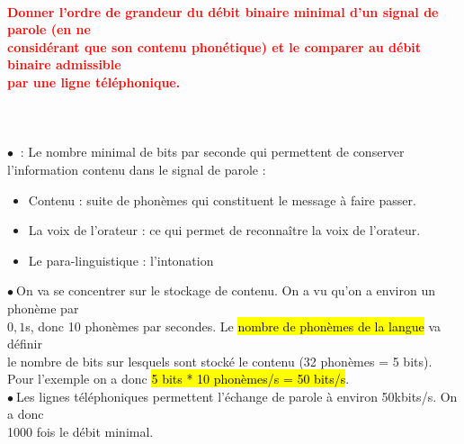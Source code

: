 \documentclass[letterpaper, 12pt]{article}
\newcommand{\alinea}{
\hspace*{0.3cm}}
\newcommand{\red}[1]{
	\textcolor{red}{#1}
}
\newcommand{\myul}[1]{
	\underline{\smash{#1}}
}
\newcommand{\point}{$\bullet\ $}
\begin{document}
		\paragraph{\red{Donner l'ordre de grandeur du débit binaire minimal d'un signal de parole (en ne  
		~\\ \hspace*{0.035cm} considérant que son contenu phonétique) et le comparer au débit binaire admissible  
		~\\ \hspace*{0.035cm} par une ligne téléphonique.}}~\\~\\
			\point \myul{Débit minimal} : Le nombre minimal de bits par seconde qui permettent de conserver
				\\\alinea l'information contenu dans le signal de parole : 
				\begin{itemize}
					\setlength{\itemsep}{0pt}		
					\setlength{\parskip}{0pt}		
					\setlength{\parsep}{0pt}	
					\item Contenu : suite de phonèmes qui constituent le message à faire passer.
					\item La voix de l'orateur : ce qui permet de reconnaître la voix de l'orateur.
					\item Le para-linguistique : l'intonation
				\end{itemize}
			\point On va se concentrer sur le stockage de contenu. On a vu qu'on a environ un phonème par 
				\\\alinea $0,1$s, donc 10 phonèmes par secondes. Le \hl{nombre de phon\`emes de la langue} 
				va d\'efinir
				\\\alinea le nombre de bits sur lesquels sont stocké le contenu (32 phonèmes = 5 bits).
				\\\alinea Pour l'exemple on a donc \hl{5 bits * 10 phon\`emes/s = 50 bits/s}.\\
			\point Les lignes téléphoniques permettent l'échange de parole à environ 50kbits/s. On a donc
				\\\alinea 1000 fois le débit minimal.
				
		
\end{document}
